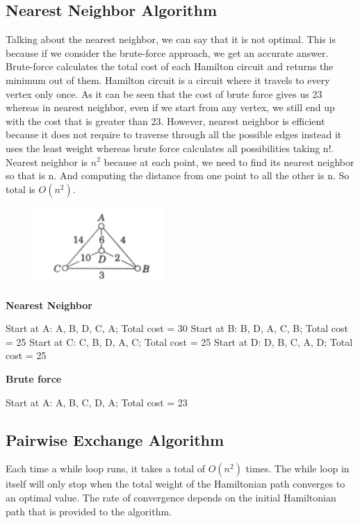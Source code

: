 \documentclass[12pt]{report}
\begin{document}
\subsection{Nearest Neighbor Algorithm}
Talking about the nearest neighbor, we can say that it is not optimal. This is because if we consider the brute-force approach, we get an accurate answer. Brute-force calculates the total cost of each Hamilton circuit and returns the minimum out of them. Hamilton circuit is a circuit where it travels to every vertex only once. As it can be seen that the cost of brute force gives us 23 whereas in nearest neighbor, even if we start from any vertex, we still end up with the cost that is greater than 23. However, nearest neighbor is efficient because it does not require to traverse through all the possible edges instead it uses the least weight whereas brute force calculates all possibilities taking n!. Nearest neighbor is $n^2$ because at each point, we need to find its nearest neighbor so that is n. And computing the distance from one point to all the other is n. So total is $O(n^2)$. \newline
\begin{figure}[htp]
    \centering
    \includegraphics[width=5cm]{Graph.PNG}
    \label{fig:galaxy}
\end{figure} \newline
\textbf{Nearest Neighbor} \newline
\begin{center}
Start at A: A, B, D, C, A; Total cost = 30 \newline
Start at B: B, D, A, C, B; Total cost = 25 \newline
Start at C: C, B, D, A, C; Total cost = 25 \newline
Start at D: D, B, C, A, D; Total cost = 25 \newline 
    \end{center}
\textbf{Brute force} \newline
\begin{center}
Start at A: A, B, C, D, A; Total cost = 23
    
\end{center}
  \subsection{Pairwise Exchange Algorithm}
Each time a while loop runs, it takes a total of $O(n^2)$ times. The while loop in itself will only stop when the total weight of the Hamiltonian path converges to an optimal value. The rate of convergence depends on the initial Hamiltonian path that is provided to the algorithm.
\end{document}
